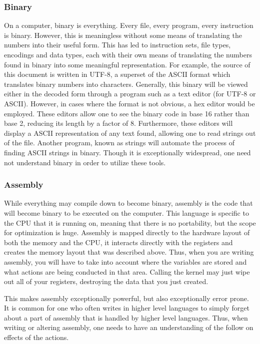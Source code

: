 		\subsubsection{Binary}
			On a computer, binary is everything.
			Every file, every program, every instruction is binary. 
			However, this is meaningless without some means of translating the numbers into their useful form. 
			This has led to instruction sets, file types, encodings and data types, each with their own means of translating the numbers found in binary into some meaningful representation. 
			For example, the source of this document is written in UTF-8, a superset of the ASCII format which translates binary numbers into characters. 
			Generally, this binary will be viewed either in the decoded form through a program such as a text editor (for UTF-8 or ASCII). 
			However, in cases where the format is not obvious, a hex editor would be employed. 
			These editors allow one to see the binary code in base 16 rather than base 2, reducing its length by a factor of 8. 
			Furthermore, these editors will display a ASCII representation of any text found, allowing one to read strings out of the file. 
			Another program, known as strings will automate the process of finding ASCII strings in binary. 
			Though it is exceptionally widespread, one need not understand binary in order to utilize these tools. 
		\subsubsection{Assembly}
			While everything may compile down to become binary, assembly is the code that will become binary to be executed on the computer. 
			This language is specific to the CPU that it is running on, meaning that there is no portability, but the scope for optimization is huge. 
			Assembly is mapped directly to the hardware layout of both the memory and the CPU, it interacts directly with the registers and creates the memory layout that was described above. 
			Thus, when you are writing assembly, you will have to take into account where the variables are stored and what actions are being conducted in that area. 
			Calling the kernel may just wipe out all of your registers, destroying the data that you just created. 

			This makes assembly exceptionally powerful, but also exceptionally error prone. 
			It is common for one who often writes in higher level languages to simply forget about a part of assembly that is handled by higher level languages. 
			Thus, when writing or altering assembly, one needs to have an understanding of the follow on effects of the actions. 

